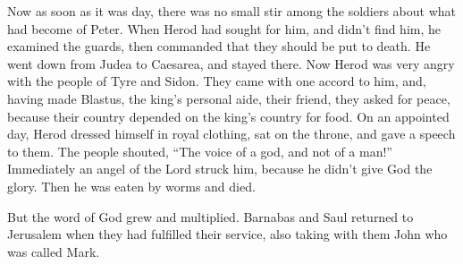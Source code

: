{\par }{\PP {}Now as soon as it was day, there was no small stir among the soldiers about what had become of Peter.
When Herod had sought for him, and didn’t find him, he examined the guards, then commanded that they should be put to death. He went down from Judea to Caesarea, and stayed there.
Now Herod was very angry with the people of Tyre and Sidon. They came with one accord to him, and, having made Blastus, the king’s personal aide, their friend, they asked for peace, because their country depended on the king’s country for food.
On an appointed day, Herod dressed himself in royal clothing, sat on the throne, and gave a speech to them.
The people shouted, “The voice of a god, and not of a man!”
Immediately an angel of the Lord struck him, because he didn’t give God the glory. Then he was eaten by worms and died.
\par }{\PP {}But the word of God grew and multiplied.
Barnabas and Saul returned to Jerusalem when they had fulfilled their service, also taking with them John who was called Mark.

}
